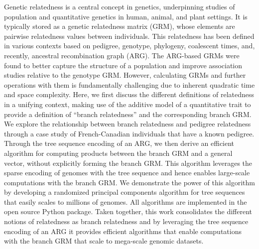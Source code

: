 Genetic relatedness is a central concept in genetics,
underpinning studies of population and quantitative genetics in human, animal, and plant settings.
%
It is typically stored as a genetic relatedness matrix (GRM),
whose elements are pairwise relatedness values between individuals.
%
This relatedness has been defined in various contexts
based on pedigree, genotype, phylogeny, coalescent times,
and, recently, ancestral recombination graph (ARG).
%
The ARG-based GRMs were found to better capture the structure of a population and
improve association studies relative to the genotype GRM.
%
However, calculating GRMs and further operations with them is fundamentally challenging
due to inherent quadratic time and space complexity.
%
Here, we first discuss the different definitions of relatedness in a unifying context,
making use of the additive model of a quantitative trait
to provide a definition of ``branch relatedness'' and the corresponding branch GRM.
%
We explore the relationship between branch relatedness and pedigree relatedness through a case study of French-Canadian individuals that have a known pedigree.
%
Through the tree sequence encoding of an ARG, we then derive an efficient algorithm for computing products between the branch GRM and a general vector, without explicitly forming the branch GRM.
%
This algorithm leverages the sparse encoding of genomes with the tree sequence and hence enables large-scale computations with the branch GRM.
%
We demonstrate the power of this algorithm by developing
a randomized principal components algorithm for tree sequences
that easily scales to millions of genomes.
%
All algorithms are implemented in the open source \tskit{} Python package.
%
Taken together, this work consolidates the different notions of relatedness as branch relatedness
and by leveraging the tree sequence encoding of an ARG it provides efficient algorithms
that enable computations with the branch GRM that scale to mega-scale genomic datasets.
